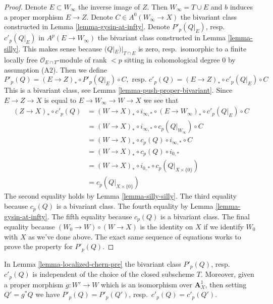 \begin{proof}
Denote $E \subset W_\infty$ the inverse image of $Z$. Then
$W_\infty = T \cup E$ and $b$ induces a proper morphism $E \to Z$.
Denote $C \in A^0(W_\infty \to X)$ the bivariant class constructed
in Lemma \ref{lemma-gysin-at-infty}. Denote $P'_p(Q|_E)$, resp.\ $c'_p(Q|_E)$
in $A^p(E \to W_\infty)$ the bivariant class constructed
in Lemma \ref{lemma-silly}. This makes sense because
$(Q|_E)|_{T \cap E}$ is zero, resp.\ isomorphic to a finite locally free
$\mathcal{O}_{E \cap T}$-module of rank $< p$ sitting in
cohomological degree $0$ by assumption (A2). Then we define
$$
P'_p(Q) = (E \to Z)_* \circ P'_p(Q|_E) \circ C,\text{ resp. }
c'_p(Q) = (E \to Z)_* \circ c'_p(Q|_E) \circ C
$$
This is a bivariant class, see Lemma \ref{lemma-push-proper-bivariant}.
Since $E \to Z \to X$ is equal to $E \to W_\infty \to W \to X$ we see that
\begin{align*}
(Z \to X)_* \circ c'_p(Q)
& =
(W \to X)_* \circ i_{\infty, *} \circ (E \to W_\infty)_*
\circ c'_p(Q|_E) \circ C \\
& =
(W \to X)_* \circ i_{\infty, *} \circ c_p(Q|_{W_\infty}) \circ C \\
& =
(W \to X)_* \circ c_p(Q) \circ i_{\infty, *} \circ C \\
& =
(W \to X)_*\circ c_p(Q) \circ i_{0, *} \\
& =
(W \to X)_* \circ i_{0, *} \circ c_p(Q|_{X \times \{0\}}) \\
& =
c_p(Q|_{X \times \{0\}})
\end{align*}
The second equality holds by Lemma \ref{lemma-silly-silly}.
The third equality because $c_p(Q)$ is a bivariant class.
The fourth equality by Lemma \ref{lemma-gysin-at-infty}.
The fifth equality because $c_p(Q)$ is a bivariant class.
The final equality because $(W_0 \to W) \circ (W \to X)$
is the identity on $X$ if we identify $W_0$ with $X$ as we've
done above. The exact same sequence of equations works to
prove the property for $P'_p(Q)$.
\end{proof}

\begin{lemma}
\label{lemma-localized-chern-pre-independent}
In Lemma \ref{lemma-localized-chern-pre} the bivariant class
$P'_p(Q)$, resp.\ $c'_p(Q)$
is independent of the choice of the closed subscheme $T$.
Moreover, given a proper morphism $g : W' \to W$ which is an
isomorphism over $\mathbf{A}^1_X$, then setting $Q' = g^*Q$
we have $P'_p(Q) = P'_p(Q')$, resp.\ $c'_p(Q) = c'_p(Q')$.
\end{lemma}

